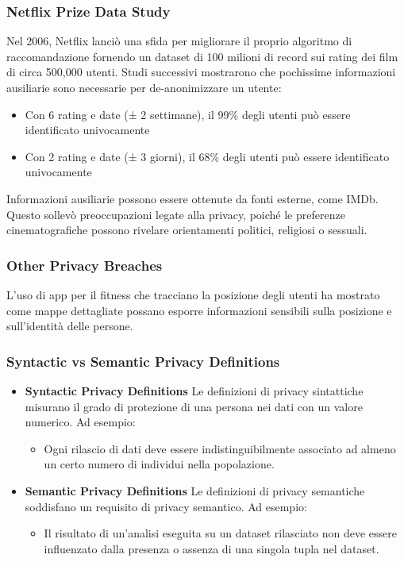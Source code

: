 \documentclass{report}
\begin{document}
\subsubsection{ Netflix Prize Data Study}
Nel 2006, Netflix lanciò una sfida per migliorare il proprio algoritmo di raccomandazione fornendo un dataset di 100 milioni di record sui rating dei film di circa 500,000 utenti. Studi successivi mostrarono che pochissime informazioni ausiliarie sono necessarie per de-anonimizzare un utente:
\begin{itemize}
    \item Con 6 rating e date (± 2 settimane), il 99\% degli utenti può essere identificato univocamente
    \item Con 2 rating e date (± 3 giorni), il 68\% degli utenti può essere identificato univocamente
\end{itemize}
Informazioni ausiliarie possono essere ottenute da fonti esterne, come IMDb. Questo sollevò preoccupazioni legate alla privacy, poiché le preferenze cinematografiche possono rivelare orientamenti politici, religiosi o sessuali.

\subsubsection{ Other Privacy Breaches}
L'uso di app per il fitness che tracciano la posizione degli utenti ha mostrato come mappe dettagliate possano esporre informazioni sensibili sulla posizione e sull'identità delle persone.

\subsubsection{ Syntactic vs Semantic Privacy Definitions}
\begin{itemize}
    \item \textbf{Syntactic Privacy Definitions}
    Le definizioni di privacy sintattiche misurano il grado di protezione di una persona nei dati con un valore numerico. Ad esempio:
    \begin{itemize}
        \item Ogni rilascio di dati deve essere indistinguibilmente associato ad almeno un certo numero di individui nella popolazione.
    \end{itemize}

    \item \textbf{Semantic Privacy Definitions}
    Le definizioni di privacy semantiche soddisfano un requisito di privacy semantico. Ad esempio:
    \begin{itemize}
        \item Il risultato di un'analisi eseguita su un dataset rilasciato non deve essere influenzato dalla presenza o assenza di una singola tupla nel dataset.
    \end{itemize}
\end{itemize}
\end{document}
